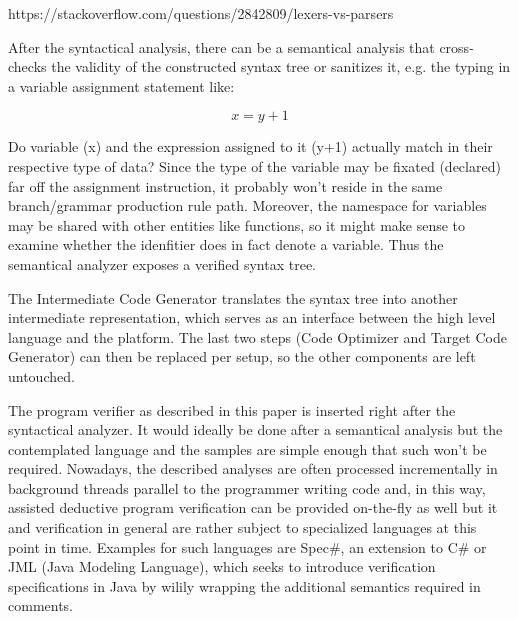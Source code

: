 https://stackoverflow.com/questions/2842809/lexers-vs-parsers


%

After the syntactical analysis, there can be a semantical analysis that cross-checks the validity of the constructed syntax tree or sanitizes it, e.g. the typing in a variable assignment statement like:

\begin{equation}
	x=y+1
\end{equation}

Do variable (x) and the expression assigned to it (y+1) actually match in their respective type of data? Since the type of the variable may be fixated (declared) far off the assignment instruction, it probably won't reside in the same branch/grammar production rule path. Moreover, the namespace for variables may be shared with other entities like functions, so it might make sense to examine whether the idenfitier does in fact denote a variable. Thus the semantical analyzer exposes a verified syntax tree.

The Intermediate Code Generator translates the syntax tree into another intermediate representation, which serves as an interface between the high level language and the platform. The last two steps (Code Optimizer and Target Code Generator) can then be replaced per setup, so the other components are left untouched.

The program verifier as described in this paper is inserted right after the syntactical analyzer. It would ideally be done after a semantical analysis but the contemplated language and the samples are simple enough that such won't be required. Nowadays, the described analyses are often processed incrementally in background threads parallel to the programmer writing code and, in this way, assisted deductive program verification can be provided on-the-fly as well but it and verification in general are rather subject to specialized languages at this point in time. Examples for such languages are Spec\#, an extension to C\# or JML (Java Modeling Language), which seeks to introduce verification specifications in Java by wilily wrapping the additional semantics required in comments.

